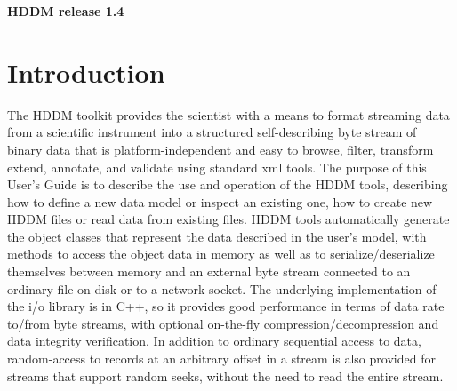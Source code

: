 \documentclass{revtex4}
\begin{document}
%
%
%
%

\begin{center}
{\bf HDDM release 1.4}
\end{center}

\newpage
\tableofcontents
\newpage
\section{Introduction}

The HDDM toolkit provides the scientist with a means to format streaming data
from a scientific instrument into a structured self-describing byte stream of
binary data that is platform-independent and easy to browse, filter, transform
extend, annotate, and validate using standard xml tools. The purpose of this 
User's Guide is to describe the use and operation of the HDDM tools, describing
how to define a new data model or inspect an existing one, how to create new
HDDM files or read data from existing files. HDDM tools automatically generate
the object classes that represent the data described in the user's model, with
methods to access the object data in memory as well as to serialize/deserialize
themselves between memory and an external byte stream connected to an ordinary
file on disk or to a network socket. The underlying implementation of the i/o
library is in C++, so it provides good performance in terms of data rate to/from
byte streams, with optional on-{}the-{}fly compression/decompression and data 
integrity verification. In addition to ordinary sequential access to data,
random-{}access to records at an arbitrary offset in a stream is also provided
for streams that support random seeks, without the need to read the entire stream.
\end{document}
